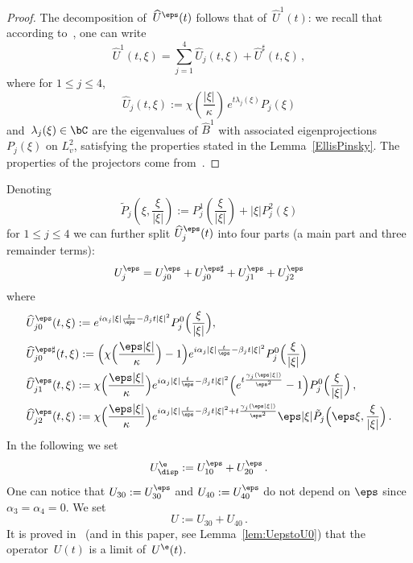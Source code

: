 \begin{proof}
The decomposition of~$\widehat U^\eps(t)$ follows that of~$\widehat U^1(t)$: we recall that according to~\cite{Ellis-Pinsky}, one can write
\[
\widehat U^1(t,\xi) = \sum_{j=1}^4 \widehat U _j(t,\xi) + \widehat U^{\sharp}(t,\xi) \,,
\]
where for $1 \le j \le 4$,
\[
\widehat U _j(t,\xi) := \chi\left(\frac{|\xi|}\kappa\right) \, e^{t \lambda_j(\xi)} P_j(\xi)
\]
and~$\lambda_j(\xi) \in \bC$ are the eigenvalues of $\widehat B^1$ with associated eigenprojections $P_j(\xi)$ on $L^2_v$, satisfying the properties stated in the Lemma~\ref{EllisPinsky}. The properties of the projectors come from~\cite{Bardos-Ukai, Ellis-Pinsky}.
\end{proof}

\begin{rema}\label{defU}
Denoting
\begin{equation}\label{deftildeP1j}
\tilde P_j \left(\xi, \frac{\xi}{|\xi|}\right) := P_{j}^1\left(\frac{\xi}{|\xi|}\right) + |\xi| P_{j}^2(\xi)
\end{equation}
for $1 \le j \le 4$ we can further split $\widehat U^\eps_j(t)$ into four parts (a main part and three remainder terms):
\[
U^\eps_j = U^\eps_{j0} + U^{\eps\sharp}_{j0} + U^\eps_{j1} + U^\eps_{j2}
\]
where
\begin{align*}
&\widehat U^\eps_{j0}(t,\xi) := e^{i\alpha_j |\xi|\frac{t}{\eps} - \beta_j t |\xi|^2} P_{j}^0\Big(\frac{\xi}{|\xi|}\Big), \\
&\widehat U^{\eps\sharp}_{j0}(t,\xi) := \Big(\chi\Big (\frac{\eps|\xi|}\kappa\Big)-1\Big) e^{i\alpha_j |\xi|\frac{t}{\eps} - \beta_j t |\xi|^2}P_{j}^0\Big(\frac{\xi}{|\xi|}\Big)\\
&\widehat U^\eps_{j1}(t,\xi) := \chi\Big (\frac{\eps|\xi|}\kappa\Big) e^{i\alpha_j |\xi|\frac{t}{\eps} - \beta_j t |\xi|^2} \Big(e^{t \frac{\gamma_j(\eps|\xi|)}{\eps^2}}-1 \Big)P_{j}^0\Big(\frac{\xi}{|\xi|}\Big)\,, \\
&\widehat U^\eps_{j2}(t,\xi) := \chi\Big (\frac{\eps|\xi|}\kappa\Big) e^{i\alpha_j |\xi|\frac{t}{\eps} - \beta_j t |\xi|^2+ t \frac{\gamma_j(\eps|\xi|)}{\eps^2}} \eps |\xi|\tilde P_{j} \Big(\eps \xi, \frac{\xi}{|\xi|}\Big)
\,.
\end{align*}
In the following we set
\[
U^\e_{\disp}:=U^\eps_{10} + U^\eps_{20} \,.
\]
One can notice that $U_{30}:=U^\eps_{30}$ and $U_{40}:=U^\eps_{40}$ do not depend on $\eps$ since $\alpha_3=\alpha_4=0$. We set
\[
U := U_{30} + U_{40}\,.
\]
It is proved in~\cite{Bardos-Ukai} (and in this paper, see Lemma~\ref{lem:UepstoU0}) that the operator~$U(t)$ is a limit of~$U^\e(t)$.
\end{rema}

